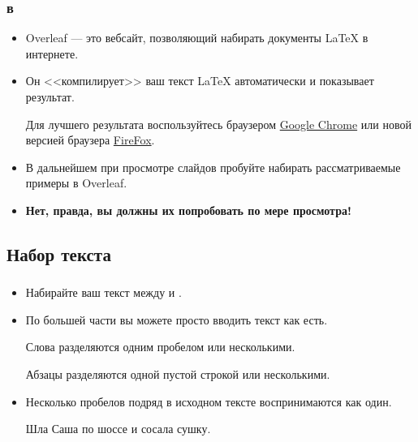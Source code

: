 \documentclass{beamer}
\begin{document}
\begin{frame}[fragile]
\frametitle{\insertsubsection{} в \wllogo}
\begin{itemize}
\item Overleaf --- это вебсайт, позволяющий набирать документы \LaTeX{} в интернете.
\item Он <<компилирует>> ваш текст \LaTeX{} автоматически и показывает результат.
\begin{center}

\vspace{1ex}
\scriptsize
Для лучшего результата воспользуйтесь браузером
\href{http://www.google.com/chrome}{Google Chrome} или новой версией браузера
\href{http://www.mozilla.org/en-US/firefox/new/}{FireFox}.
\end{center}
\vspace{1ex}
\item В дальнейшем при просмотре слайдов пробуйте набирать рассматриваемые
  примеры в Overleaf.
\item \textbf{Нет, правда, вы должны их попробовать по мере просмотра!}
\end{itemize}
\end{frame}

\subsection{Набор текста}

\begin{frame}[fragile]
\frametitle{\insertsubsection{}}
\small
\begin{itemize}
\item Набирайте ваш текст между  и .
\item По большей части вы можете просто вводить текст как есть.

\begin{exampletwouptiny}
Слова разделяются одним
пробелом или несколькими.

Абзацы разделяются одной
пустой строкой или
несколькими.
\end{exampletwouptiny}
\item Несколько пробелов подряд в исходном тексте воспринимаются как один.

\begin{exampletwouptiny}
Шла     Саша    по  шоссе
и      сосала      сушку.
\end{exampletwouptiny}
\end{itemize}
\end{frame}
\end{document}
